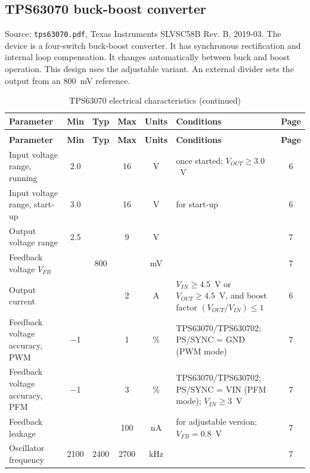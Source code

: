 \subsection{TPS63070 buck-boost converter}
\label{sec:tps63070}

Source: \texttt{tps63070.pdf}, Texas Instruments SLVSC58B Rev. B, 2019-03. The
device is a four-switch buck-boost converter. It has synchronous rectification
and internal loop compensation. It changes automatically between buck and boost
operation. This design uses the adjustable variant. An external divider sets
the output from an \SI{800}{\milli\volt} reference.

{\footnotesize
\begin{longtable}{|L{4.4cm}|c|c|c|c|L{3.6cm}|c|}
\caption{TPS63070 electrical characteristics}\label{tab:tps63070}\\
\hline
\textbf{Parameter} & \textbf{Min} & \textbf{Typ} & \textbf{Max} & \textbf{Units} & \textbf{Conditions} & \textbf{Page} \\
\hline
\endfirsthead
\caption[]{TPS63070 electrical characteristics (continued)}\\
\hline
\textbf{Parameter} & \textbf{Min} & \textbf{Typ} & \textbf{Max} & \textbf{Units} & \textbf{Conditions} & \textbf{Page} \\
\hline
\endhead
Input voltage range, running & \num{2.0} & & \num{16} & \si{\volt} & once started; \(V_{OUT}\geq3.0\)~V & 6 \\
\hline
Input voltage range, start-up & \num{3.0} & & \num{16} & \si{\volt} & for start-up & 6 \\
\hline
Output voltage range & \num{2.5} & & \num{9} & \si{\volt} & & 7 \\
\hline
Feedback voltage \(V_{FB}\) & & \num{800} & & \si{\milli\volt} & & 7 \\
\hline
Output current & & & \num{2} & \si{\ampere} & \(V_{IN}\geq4.5\)~V or \(V_{OUT}\geq4.5\)~V, and boost factor \((V_{OUT}/V_{IN})\leq1\) & 6 \\
\hline
Feedback voltage accuracy, PWM & \num{-1} & & \num{1} & \% & TPS63070/TPS630702; PS/SYNC = GND (PWM mode) & 7 \\
\hline
Feedback voltage accuracy, PFM & \num{-1} & & \num{3} & \% & TPS63070/TPS630702; PS/SYNC = VIN (PFM mode); \(V_{IN}\geq3\)~V & 7 \\
\hline
Feedback leakage & & & \num{100} & \si{\nano\ampere} & for adjustable version; \(V_{FB}=0.8\)~V & 7 \\
\hline
Oscillator frequency & \num{2100} & \num{2400} & \num{2700} & \si{\kilo\hertz} & & 7 \\

\end{longtable}}
